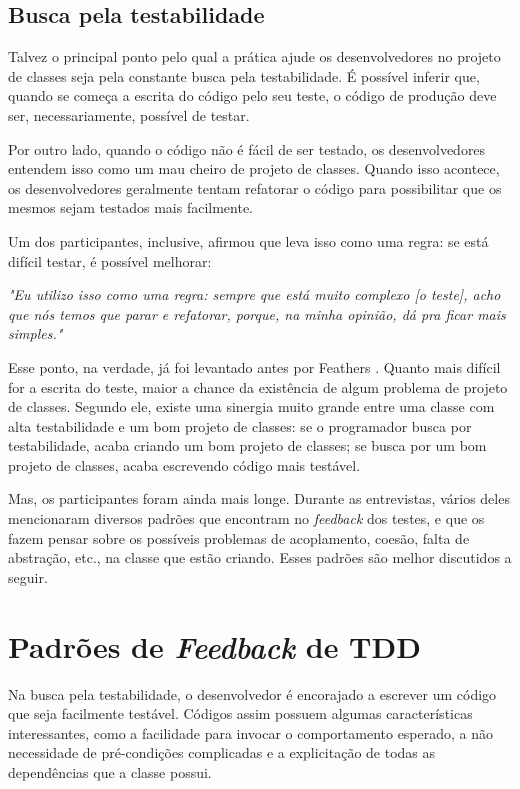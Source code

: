 \subsection{Busca pela testabilidade}

Talvez o principal ponto pelo qual a prática ajude os desenvolvedores no projeto de classes 
seja pela constante busca pela testabilidade. É possível inferir que, quando se 
começa a escrita do código pelo seu teste, o código de produção deve ser, necessariamente,
possível de testar.

Por outro lado, quando o código não é fácil de ser testado, os desenvolvedores
entendem isso como um mau cheiro de projeto de classes. Quando isso acontece,
os desenvolvedores geralmente tentam refatorar o código para possibilitar que
os mesmos sejam testados mais facilmente.

Um dos participantes, inclusive, afirmou que leva isso como uma regra:
se está difícil testar, é possível melhorar:

\begin{framed}
\textit{"Eu utilizo isso como uma regra: sempre que está muito complexo [o teste],
acho que nós temos que parar e refatorar, porque, na minha opinião, dá
pra ficar mais simples."}
\end{framed}

Esse ponto, na verdade, já foi levantado antes por Feathers \cite{feathers-synergy}.
Quanto mais difícil for a escrita do teste, maior a chance da existência de
algum problema de projeto de classes. Segundo ele, 
existe uma sinergia muito grande entre uma classe com alta testabilidade e um bom projeto de classes: 
se o programador busca por testabilidade, acaba criando um bom projeto de classes; se 
busca por um bom projeto de classes, acaba escrevendo código mais
testável.

Mas, os participantes foram ainda mais longe. Durante as entrevistas,
vários deles mencionaram diversos padrões que encontram no \textit{feedback} dos testes,
e que os fazem pensar sobre os possíveis problemas de acoplamento,
coesão, falta de abstração, etc., na classe que estão criando.
Esses padrões são melhor discutidos a seguir.

\section{Padrões de \textit{Feedback} de TDD}
\label{padroes-tdd}

Na busca pela testabilidade, o desenvolvedor é encorajado a escrever um
código que seja facilmente testável. Códigos assim possuem algumas
características interessantes, como a facilidade para invocar o comportamento
esperado, a não necessidade de pré-condições complicadas e a explicitação de
todas as dependências que a classe possui.


